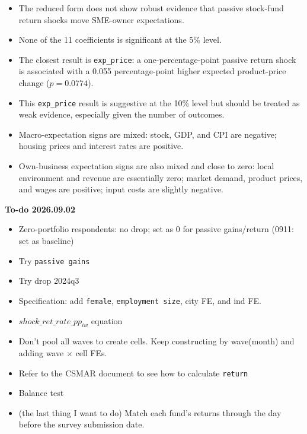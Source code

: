 \documentclass[11pt,letterpaper,english,final]{article}
\begin{document}
\begin{itemize}
\item The reduced form does not show robust evidence that passive stock-fund return shocks move SME-owner expectations.
\item None of the 11 coefficients is significant at the 5\% level.
\item The closest result is \texttt{exp\_price}: a one-percentage-point passive return shock is associated with a 0.055 percentage-point higher expected product-price change ($p=0.0774$).
\item This \texttt{exp\_price} result is suggestive at the 10\% level but should be treated as weak evidence, especially given the number of outcomes.
\item Macro-expectation signs are mixed: stock, GDP, and CPI are negative; housing prices and interest rates are positive.
\item Own-business expectation signs are also mixed and close to zero: local environment and revenue are essentially zero; market demand, product prices, and wages are positive; input costs are slightly negative.
\end{itemize}


\textbf{To-do 2026.09.02}
{\color{cyan}
\begin{itemize}
\item Zero-portfolio respondents: no drop; set as 0 for passive gains/return (0911: set as baseline)

\item Try \texttt{passive gains}

\item Try drop 2024q3

\item Specification: add \texttt{female}, \texttt{employment size}, city FE, and ind FE.


\item $shock\_ret\_rate\_pp_{iw} $ equation


\item Don't pool all waves to create cells. Keep constructing by wave(month) and adding wave $\times$ cell FEs.

\item Refer to the CSMAR document to see how to calculate \texttt{return}



\item Balance test



\item (the last thing I want to do) Match each fund's returns through the day before the survey submission date.

\end{itemize}
}
\end{document}
